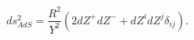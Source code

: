 \begin{equation}
\label{eq:AdS metric}
    ds^2_{AdS}=\frac{R^2}{Y^2} \left(
    2 dZ^+ dZ^- + dZ^i dZ^j \delta_{ij}
    \right).
\end{equation}

